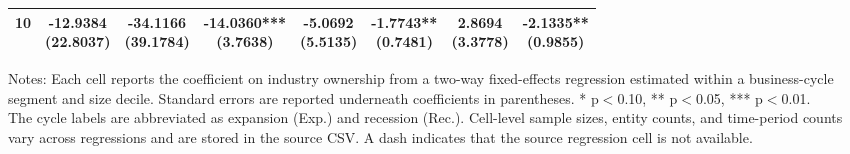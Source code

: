 \begin{table}[!htbp]
\begin{threeparttable}
\begin{tabular}{@{}lccccccc@{}}
10 & \shortstack{-12.9384\\(22.8037)} & \shortstack{-34.1166\\(39.1784)} & \shortstack{-14.0360***\\(3.7638)} & \shortstack{-5.0692\\(5.5135)} & \shortstack{-1.7743**\\(0.7481)} & \shortstack{2.8694\\(3.3778)} & \shortstack{-2.1335**\\(0.9855)} \\
\bottomrule
\end{tabular}
\vspace{0.35em}
\noindent\parbox{\textwidth}{\footnotesize
Notes: Each cell reports the coefficient on industry ownership from a two-way fixed-effects regression estimated within a business-cycle segment and size decile. Standard errors are reported underneath coefficients in parentheses. * p$<$0.10, ** p$<$0.05, *** p$<$0.01.\\
The cycle labels are abbreviated as expansion (Exp.) and recession (Rec.). Cell-level sample sizes, entity counts, and time-period counts vary across regressions and are stored in the source CSV. A dash indicates that the source regression cell is not available.
}
\end{threeparttable}
\end{table}

